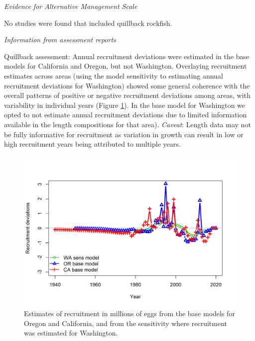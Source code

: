 \documentclass[11pt,
  english,
  letterpaper,
]{article}
\begin{document}

\emph{Evidence for Alternative Management Scale}

\leavevmode\tagmcend\tagstructend\par


No studies were found that included quillback rockfish.

\leavevmode\tagmcend\tagstructend\par


\emph{Information from assessment reports}

\leavevmode\tagmcend\tagstructend\par


Quillback assessment: Annual recruitment deviations were estimated in the base models for California and Oregon, but not Washington. Overlaying recruitment estimates across areas (using the model sensitivity to estimating annual recruitment deviations for Washington) showed some general coherence with the overall patterns of positive or negative recruitment deviations among areas, with variability in individual years (Figure \ref{fig:recruit-comparison}). In the base model for Washington we opted to not estimate annual recruitment deviations due to limited information available in the length compositions for that area). \emph{Caveat}: Length data may not be fully informative for recruitment as variation in growth can result in low or high recruitment years being attributed to multiple years.

\leavevmode\tagmcend\tagstructend\par


\begin{figure}
\centering
\includegraphics[width=1\textwidth,height=1\textheight]{comprare_recruitments.png}
\caption{Estimates of recruitment in millions of eggs from the base models for Oregon and California, and from the sensitivity where recruitment was estimated for Washington.\label{fig:recruit-comparison}}
\end{figure}
\end{document}
